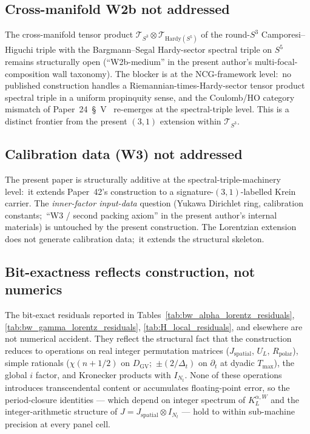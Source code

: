 \documentclass[11pt,a4paper]{article}
\theoremstyle{plain}
\theoremstyle{definition}
\newcommand{\Nt}{N_t}
\newcommand{\sthree}{S^{3}}
\newcommand{\Tcal}{\mathcal{T}}
\newcommand{\DGV}{D_{\mathrm{GV}}}
\newcommand{\KL}{K_{L}}
\begin{document}
\subsection{Cross-manifold W2b not addressed}\label{sec:scope_w2b}

The cross-manifold tensor product
$\Tcal_{\sthree} \otimes \Tcal_{\mathrm{Hardy}(S^5)}$ of the round-$\sthree$
Camporesi--Higuchi triple with the Bargmann--Segal Hardy-sector
spectral triple on $S^5$ remains structurally open
(``W2b-medium'' in the present author's multi-focal-composition wall
taxonomy). The blocker is at the NCG-framework level:\ no published
construction handles a Riemannian-times-Hardy-sector tensor product
spectral triple in a uniform propinquity sense, and the
Coulomb/HO category mismatch of Paper~24~\S~V~\cite{paper24}
re-emerges at the spectral-triple level. This is a distinct
frontier from the present $(3, 1)$ extension within $\Tcal_{\sthree}$.

\subsection{Calibration data (W3) not addressed}\label{sec:scope_w3}

The present paper is structurally additive at the
spectral-triple-machinery level:\ it extends Paper~42's construction
to a signature-$(3, 1)$-labelled Krein carrier. The
\emph{inner-factor input-data} question (Yukawa Dirichlet ring,
calibration constants;\ ``W3 / second packing axiom'' in the present
author's internal materials) is untouched by the present construction.
The Lorentzian extension does not generate calibration data;\ it
extends the structural skeleton.

\subsection{Bit-exactness reflects construction, not numerics}
\label{sec:scope_bit_exact}

The bit-exact residuals reported in
Tables~\ref{tab:bw_alpha_lorentz_residuals},
\ref{tab:bw_gamma_lorentz_residuals},
\ref{tab:H_local_residuals}, and elsewhere are not numerical accident.
They reflect the structural fact that the construction reduces to
operations on real integer permutation matrices ($J_{\mathrm{spatial}}$,
$U_L$, $R_{\mathrm{polar}}$), simple rationals ($\chi(n + 1/2)$ on
$\DGV$;\ $\pm (2/\Delta_t)$ on $\partial_t$ at dyadic $T_{\max}$), the
global $i$ factor, and Kronecker products with $I_{\Nt}$. None of
these operations introduces transcendental content or accumulates
floating-point error, so the period-closure identities — which depend
on integer spectrum of $\KL^{\alpha, W}$ and the integer-arithmetic
structure of $J = J_{\mathrm{spatial}} \otimes I_{\Nt}$ — hold to within
sub-machine precision at every panel cell.
\end{document}
